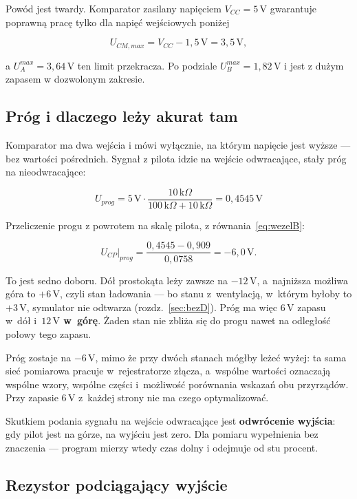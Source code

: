 \documentclass[a4paper,11pt]{article}
\newcommand{\kohm}{\,\mathrm{k}\Omega}
\newcommand{\volt}{\,\mathrm{V}}
\begin{document}
Powód jest twardy. Komparator zasilany napięciem $V_{CC}=5\volt$ gwarantuje
poprawną pracę tylko dla napięć wejściowych poniżej

\[
U_{CM,max}=V_{CC}-1{,}5\volt=3{,}5\volt ,
\]

a $U_A^{max}=3{,}64\volt$ ten limit przekracza. Po podziale
$U_B^{max}=1{,}82\volt$ i jest z dużym zapasem w dozwolonym zakresie.

\subsection{Próg i dlaczego leży akurat tam}
\label{sec:prog}

Komparator ma dwa wejścia i mówi wyłącznie, na którym napięcie jest wyższe --- bez
wartości pośrednich. Sygnał z pilota idzie na wejście odwracające, stały próg na
nieodwracające:

\begin{equation}
U_{prog}=5\volt\cdot\frac{10\kohm}{100\kohm+10\kohm}=0{,}4545\volt
\label{eq:prog}
\end{equation}

Przeliczenie progu z powrotem na skalę pilota, z równania~\eqref{eq:wezelB}:

\[
U_{CP}\big|_{prog}=\frac{0{,}4545-0{,}909}{0{,}0758}=-6{,}0\volt .
\]

To jest sedno doboru. Dół prostokąta leży zawsze na $-12\volt$, a~najniższa możliwa
góra to $+6\volt$, czyli stan ładowania --- bo stanu z~wentylacją, w~którym byłoby to
$+3\volt$, symulator nie odtwarza (rozdz.~\ref{sec:bezD}). Próg ma więc $6\volt$
zapasu w~dół i~\textbf{$12\volt$ w~górę}. Żaden stan nie zbliża się do progu nawet
na odległość połowy tego zapasu.

Próg zostaje na $-6\volt$, mimo że przy dwóch stanach mógłby leżeć wyżej: ta sama
sieć pomiarowa pracuje w~rejestratorze złącza, a~wspólne wartości oznaczają wspólne
wzory, wspólne części i~możliwość porównania wskazań obu przyrządów. Przy zapasie
$6\volt$ z~każdej strony nie ma czego optymalizować.

Skutkiem podania sygnału na wejście odwracające jest \textbf{odwrócenie wyjścia}:
gdy pilot jest na górze, na wyjściu jest zero. Dla pomiaru wypełnienia bez
znaczenia --- program mierzy wtedy czas dolny i odejmuje od stu procent.

\subsection{Rezystor podciągający wyjście}
\end{document}
